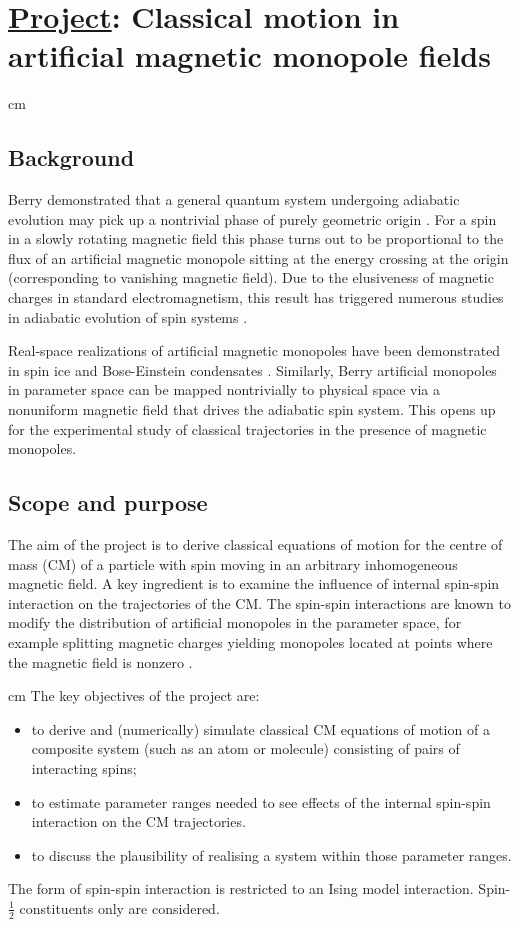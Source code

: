 \documentclass [a4paper]{article}
\begin{document}
\section*{{\underline{Project}}: Classical motion in artificial magnetic monopole fields}
 cm
\subsection*{Background} 
Berry demonstrated that a general quantum system undergoing adiabatic evolution 
may pick up a nontrivial phase of purely geometric origin \cite{berry84}. For a spin in a slowly 
rotating magnetic field this phase turns out to be proportional to the flux of an artificial magnetic 
monopole sitting at the energy crossing at the origin (corresponding to vanishing magnetic 
field). Due to the elusiveness of magnetic charges in standard electromagnetism, this result 
has triggered numerous studies in adiabatic evolution of spin systems \cite{shapere89}.  

Real-space realizations of artificial magnetic monopoles have been demonstrated in spin ice 
\cite{castelnovo08} and Bose-Einstein condensates \cite{ray15}. Similarly, Berry artificial 
monopoles in parameter space can be mapped nontrivially to physical space via a nonuniform 
magnetic field that drives the adiabatic spin system. This opens up for  the experimental 
study of classical trajectories in the presence of magnetic monopoles.  

\subsection*{Scope and purpose} 
The aim of the project is to derive classical equations of motion for the centre of mass 
(CM) of a particle with spin moving in an arbitrary inhomogeneous magnetic field. A key ingredient is to 
examine the influence of internal spin-spin interaction on the trajectories of the CM. The 
spin-spin interactions are known to modify the distribution of artificial monopoles in the
parameter space, for example 
splitting magnetic charges yielding monopoles located at points where the magnetic field is 
nonzero \cite{eriksson20}.  

 cm 
\noindent
The key objectives of the project are: 
\begin{itemize}
\item to derive and (numerically) simulate classical CM equations of motion of a composite 
system (such as an atom or molecule) consisting of pairs of interacting spins; 
\item to estimate parameter ranges needed to see effects of the internal spin-spin 
interaction on the CM trajectories.
\item to discuss the plausibility of realising a system within those parameter ranges.
\end{itemize}
The form of spin-spin interaction is restricted to an Ising model interaction.
Spin-$\frac{1}{2}$ constituents only are
considered. 
\end{document}
